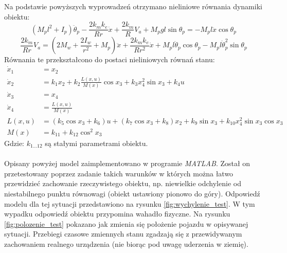 Na podstawie powyższych wyprowadzeń otrzymano nieliniowe równania dynamiki obiektu:
\begin{equation}
(M_pl^2+I_p)\ddot \theta_p-\frac{2k_mk_e}{Rr}\dot{x}+\frac{2k_m}{R}V_a+M_pgl\sin \theta_p=-M_pl\ddot x\cos \theta_p
\end{equation}
\begin{equation}
\frac{2k_m}{Rr}V_a=(2M_w+\frac{2I_w}{r^2}+M_p)\ddot x+\frac{2k_mk_e}{Rr^2}\dot x+M_pl\ddot \theta_p\cos \theta_p-M_pl\dot \theta_p^2\sin \theta_p
\end{equation}
Równania te przekształcono do postaci nieliniowych równań stanu:
\begin{equation}
\begin{aligned}
\dot x_1 &= x_2\\
\dot x_2 &= k_1x_2+k_2\frac{L(x,u)}{M(x)}\cos x_3+k_3x_4^2\sin x_3+k_4u\\
\dot x_3 &= x_4\\
\dot x_4 &= \frac{L(x,u)}{M(x)}\\
L(x,u) &= (k_5\cos x_3+k_6)u+(k_7\cos x_3+k_8)x_2+k_9\sin x_3+k_{10}x_4^2\sin x_3\cos x_3\\
M(x) &= k_{11}+k_{12}\cos ^2x_3
\end{aligned}
\label{eq:nonlinear_ss}
\end{equation}
\noindent Gdzie:\newline
\(k_{1\dots 12}\) są stałymi parametrami obiektu.

\paragraph*{}
Opisany powyżej model zaimplementowano w programie \textit{MATLAB}. Został on przetestowany poprzez zadanie takich warunków w których można łatwo przewidzieć zachowanie rzeczywistego obiektu, np. niewielkie odchylenie od niestabilnego punktu równowagi (obiekt ustawiony pionowo do góry). Odpowiedź modelu dla tej sytuacji przedstawiono na rysunku \ref{fig:wychylenie_test}. W tym wypadku odpowiedź obiektu przypomina wahadło fizyczne. Na rysunku \ref{fig:polozenie_test} pokazano jak zmienia się położenie pojazdu w opisywanej sytuacji. Przebiegi czasowe zmiennych stanu zgadzają się z przewidywanym zachowaniem realnego urządzenia (nie biorąc pod uwagę uderzenia w ziemię).


